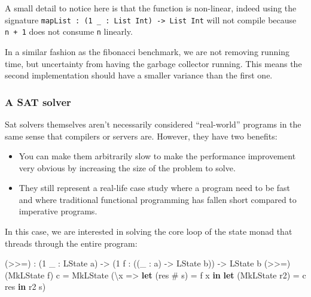 \documentclass[
]{article}
\newenvironment{Shaded}{}{}
\newcommand{\DataTypeTok}[1]{\textcolor[rgb]{0.56,0.13,0.00}{#1}}
\newcommand{\DecValTok}[1]{\textcolor[rgb]{0.25,0.63,0.44}{#1}}
\newcommand{\KeywordTok}[1]{\textcolor[rgb]{0.00,0.44,0.13}{\textbf{#1}}}
\newcommand{\NormalTok}[1]{#1}
\newcommand{\OperatorTok}[1]{\textcolor[rgb]{0.40,0.40,0.40}{#1}}
\newcommand{\OtherTok}[1]{\textcolor[rgb]{0.00,0.44,0.13}{#1}}
\providecommand{\tightlist}{%
  \setlength{\itemsep}{0pt}\setlength{\parskip}{0pt}}
\begin{document}
A small detail to notice here is that the function is non-linear, indeed
using the signature
\texttt{mapList\ :\ (1\ \_\ :\ List\ Int)\ -\textgreater{}\ List\ Int}
will not compile because \texttt{n\ +\ 1} does not consume \texttt{n}
linearly.

In a similar fashion as the fibonacci benchmark, we are not removing
running time, but uncertainty from having the garbage collector running.
This means the second implementation should have a smaller variance than
the first one.

\hypertarget{a-sat-solver}{%
\subsubsection{A SAT solver}\label{a-sat-solver}}

Sat solvers themselves aren't necessarily considered ``real-world''
programs in the same sense that compilers or servers are. However, they
have two benefits:

\begin{itemize}
\tightlist
\item
  You can make them arbitrarily slow to make the performance improvement
  very obvious by increasing the size of the problem to solve.
\item
  They still represent a real-life case study where a program need to be
  fast and where traditional functional programming has fallen short
  compared to imperative programs.
\end{itemize}

In this case, we are interested in solving the core loop of the state
monad that threads through the entire program:

\begin{Shaded}
\begin{Highlighting}[]
\NormalTok{(}\OperatorTok{\textgreater{}\textgreater{}=}\NormalTok{) }\OperatorTok{:}\NormalTok{ (}\DecValTok{1}\NormalTok{ \_ }\OperatorTok{:} \DataTypeTok{LState}\NormalTok{ a) }\OtherTok{{-}\textgreater{}}\NormalTok{ (}\DecValTok{1}\NormalTok{ f }\OperatorTok{:}\NormalTok{ ((\_ }\OperatorTok{:}\NormalTok{ a) }\OtherTok{{-}\textgreater{}} \DataTypeTok{LState}\NormalTok{ b))}
     \OtherTok{{-}\textgreater{}} \DataTypeTok{LState}\NormalTok{ b}
\NormalTok{(}\OperatorTok{\textgreater{}\textgreater{}=}\NormalTok{) (}\DataTypeTok{MkLState}\NormalTok{ f) c }\OtherTok{=} \DataTypeTok{MkLState} 
\NormalTok{    (\textbackslash{}x }\OtherTok{=\textgreater{}} \KeywordTok{let}\NormalTok{ (res }\OperatorTok{\#}\NormalTok{ s\textquotesingle{}) }\OtherTok{=}\NormalTok{ f x }\KeywordTok{in}
           \KeywordTok{let}\NormalTok{ (}\DataTypeTok{MkLState}\NormalTok{ r2) }\OtherTok{=}\NormalTok{ c res }\KeywordTok{in} 
\NormalTok{           r2 s\textquotesingle{})}
\end{Highlighting}
\end{Shaded}
\end{document}
